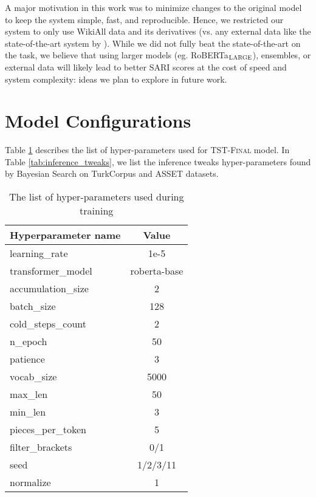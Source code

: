 \documentclass[11pt,a4paper]{article}
\begin{document}
A major motivation in this work was to minimize changes to the original model to keep the system simple, fast, and reproducible. Hence, we restricted our system to only use WikiAll data and its derivatives (vs. any external data like the state-of-the-art system by  \citet{martin2020multilingual}). While we did not fully beat the state-of-the-art on the task, we believe that using larger models (eg. RoBERTa$_{\textsc{LARGE}}$), ensembles, or external data will likely lead to better SARI scores at the cost of speed and system complexity: ideas we plan to explore in future work. 







\clearpage

\appendix

\section{Model Configurations}
\label{sec:appendix1}
Table \ref{tab:hyperparameters} describes the list of hyper-parameters used for \textsc{TST-Final} model. In Table \ref{tab:inference_tweaks}, we list the inference tweaks hyper-parameters found by Bayesian Search on TurkCorpus and ASSET datasets. 



\begin{table}[H]
\begin{center}
\small
\begin{tabular}{lc}
\toprule
\textbf{Hyperparameter name} & \textbf{Value} \\
\toprule
learning\_rate & 1e-5\\
transformer\_model & roberta-base \\
accumulation\_size & 2 \\
batch\_size & 128 \\
cold\_steps\_count & 2 \\
n\_epoch & 50 \\
patience & 3 \\
vocab\_size & 5000 \\
max\_len & 50 \\
min\_len & 3 \\
pieces\_per\_token & 5 \\
filter\_brackets & 0/1 \\
seed & 1/2/3/11 \\
normalize & 1 \\
\bottomrule
\end{tabular}
\caption{The list of hyper-parameters used during training}
\label{tab:hyperparameters}
\end{center}
\end{table}
\end{document}
